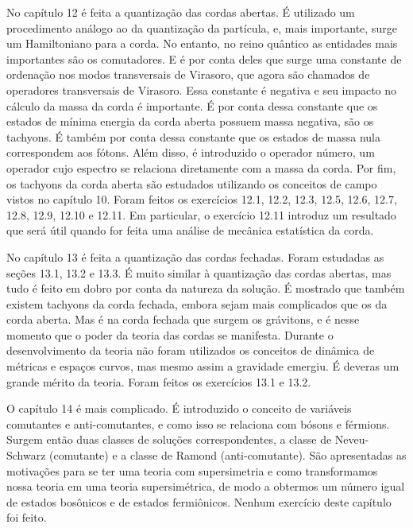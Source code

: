 \documentclass[oneside, 12pt]{article}
\begin{document}
No capítulo 12 é feita a quantização das cordas abertas. É utilizado um procedimento análogo ao da quantização da partícula, e, mais importante, surge um Hamiltoniano para a corda. No entanto, no reino quântico as entidades mais importantes são os comutadores. E é por conta deles que surge uma constante de ordenação nos modos transversais de Virasoro, que agora são chamados de operadores transversais de Virasoro. Essa constante é negativa e seu impacto no cálculo da massa da corda é importante. É por conta dessa constante que os estados de mínima energia da corda aberta possuem massa negativa, são os tachyons. É também por conta dessa constante que os estados de massa nula correspondem aos fótons. Além disso, é introduzido o operador número, um operador cujo espectro se relaciona diretamente com a massa da corda. Por fim, os tachyons da corda aberta são estudados utilizando os conceitos de campo vistos no capítulo 10. Foram feitos os exercícios 12.1, 12.2, 12.3, 12.5, 12.6, 12.7, 12.8, 12.9, 12.10 e 12.11. Em particular, o exercício 12.11 introduz um resultado que será útil quando for feita uma análise de mecânica estatística da corda.\par 

No capítulo 13 é feita a quantização das cordas fechadas. Foram estudadas as seções 13.1, 13.2 e 13.3. É muito similar à quantização das cordas abertas, mas tudo é feito em dobro por conta da natureza da solução. É mostrado que também existem tachyons da corda fechada, embora sejam mais complicados que os da corda aberta. Mas é na corda fechada que surgem os grávitons, e é nesse momento que o poder da teoria das cordas se manifesta. Durante o desenvolvimento da teoria não foram utilizados os conceitos de dinâmica de métricas e espaços curvos, mas mesmo assim a gravidade emergiu. É deveras um grande mérito da teoria. Foram feitos os exercícios 13.1 e 13.2.\par 

O capítulo 14 é mais complicado. É introduzido o conceito de variáveis comutantes e anti-comutantes, e como isso se relaciona com bósons e férmions. Surgem então duas classes de soluções correspondentes, a classe de Neveu-Schwarz (comutante) e a classe de Ramond (anti-comutante). São apresentadas as motivações para se ter uma teoria com supersimetria e como transformamos nossa teoria em uma teoria supersimétrica, de modo a obtermos um número igual de estados bosônicos e de estados fermiônicos. Nenhum exercício deste capítulo foi feito.\par 
\end{document}
